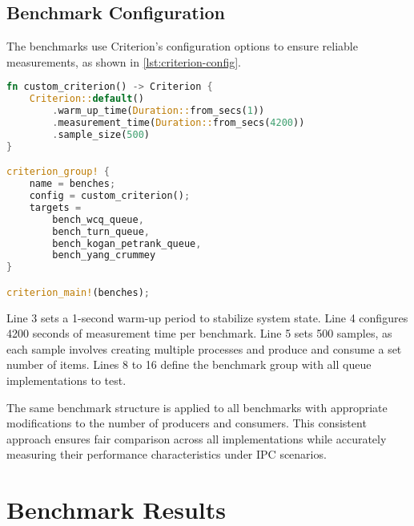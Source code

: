 \subsection{Benchmark Configuration}
The benchmarks use Criterion's configuration options to ensure reliable measurements, as shown in \cref{lst:criterion-config}.

\begin{lstlisting}[language=Rust, style=boxed, caption={Criterion benchmark configuration}, label={lst:criterion-config}]
fn custom_criterion() -> Criterion {
    Criterion::default()
        .warm_up_time(Duration::from_secs(1))
        .measurement_time(Duration::from_secs(4200))
        .sample_size(500)
}

criterion_group! {
    name = benches;
    config = custom_criterion();
    targets =
        bench_wcq_queue,
        bench_turn_queue,
        bench_kogan_petrank_queue,
        bench_yang_crummey
}

criterion_main!(benches);
\end{lstlisting}

Line 3 sets a 1-second warm-up period to stabilize system state. Line 4 configures 4200 seconds of measurement time per benchmark. Line 5 sets 500 samples, as each sample involves creating multiple processes and produce and consume a set number of items. Lines 8 to 16 define the benchmark group with all queue implementations to test.

The same benchmark structure is applied to all benchmarks with appropriate modifications to the number of producers and consumers. This consistent approach ensures fair comparison across all implementations while accurately measuring their performance characteristics under \ac{IPC} scenarios.

\section{Benchmark Results}
